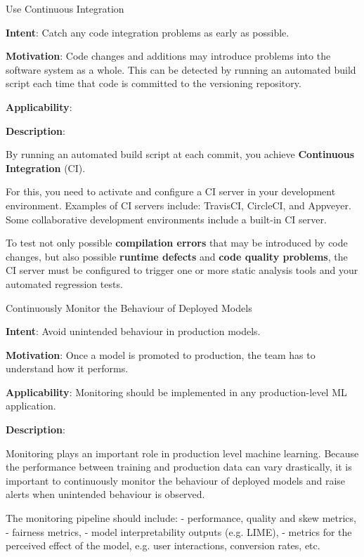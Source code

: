   
  \begin{frame}[plain]{ Use Continuous Integration
 }

  \textbf{Intent}: Catch any code integration problems as early as possible. 
 

  \textbf{Motivation}: Code changes and additions may introduce problems into the software system as a whole. This can be detected by running an automated build script each time that code is committed to the versioning repository.
 

  \textbf{Applicability}:  
 

  \textbf{Description}: 

By running an automated build script at each commit, you achieve \textbf{Continuous Integration} (CI).


For this, you need to activate and configure a CI server in your development environment. Examples of CI servers include: TravisCI, CircleCI, and Appveyer. Some collaborative development environments include a built-in CI server.


To test not only possible \textbf{compilation errors} that may be introduced by code changes, but also possible \textbf{runtime defects} and \textbf{code quality problems}, the CI server must be configured to trigger one or more static analysis tools and your automated regression tests.


 


  \end{frame}

  
  \begin{frame}[plain]{ Continuously Monitor the Behaviour of Deployed Models
 }

  \textbf{Intent}: Avoid unintended behaviour in production models. 
 

  \textbf{Motivation}: Once a model is promoted to production, the team has to understand how it performs. 
 

  \textbf{Applicability}: Monitoring should be implemented in any production-level ML application.
 

  \textbf{Description}: 

Monitoring plays an important role in production level machine learning.
Because the performance between training and production data can vary drastically, it is important to continuously monitor the behaviour of deployed models and raise alerts when unintended behaviour is observed.


The monitoring pipeline should include:
- performance, quality and skew metrics,
- fairness metrics,
- model interpretability outputs (e.g. LIME),
- metrics for the perceived effect of the model, e.g. user interactions, conversion rates, etc.


 


  \end{frame}

